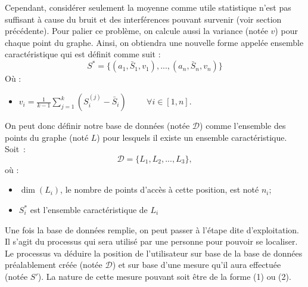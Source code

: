 \documentclass[10pt,journal,compsoc]{IEEEtran}
\begin{document}
		Cependant, considérer seulement la moyenne comme utile statistique n'est pas suffisant à cause du bruit et des interférences pouvant survenir (voir section précédente).
		Pour palier ce problème, on calcule aussi la variance (notée $v$) pour chaque point du graphe. Ainsi, on obtiendra une nouvelle forme appelée ensemble caractéristique
		qui est définit comme suit :
        \begin{equation}
          S^{*} = \{(a_{1}, \bar{S}_{1}, v_{1}), ..., (a_{n}, \bar{S}_{n}, v_{n})\}
        \end{equation}
        Où :
        \begin{itemize}
          \item $v_{i} = \frac{1}{k-1}\sum\limits_{j = 1}^{k}(S_{i}^{(j)}-\bar{S}_{i}) \hspace{1cm} \forall i \in [1,n]$.
        \end{itemize}
        On peut donc définir notre base de données (notée $\mathcal{D}$) comme l'ensemble des points du graphe (noté $L$) pour lesquels il existe un ensemble caractéristique.
		Soit~:
        \begin{equation}
          \mathcal{D} = \{L_{1}, L_{2}, ..., L_{3}\},
        \end{equation}
        où :
        \begin{itemize}
          \item $\dim(L_{i})$, le nombre de points d'accès à cette position, est noté $n_{i}$; %
          \item $S_{i}^{*}$ est l'ensemble caractéristique de $L_{i}$
        \end{itemize}

        Une fois la base de données remplie, on peut passer à l'étape dite d'exploitation. Il s'agit du processus qui sera utilisé par une personne pour pouvoir se localiser.
        Le processus va déduire la position de l'utilisateur sur base de la base de données préalablement créée (notée $\mathcal{D}$) et sur base d'une mesure qu'il aura effectuée
		(notée $S'$). La nature de cette mesure pouvant soit être de la forme (1) ou (2). %
	
\end{document}
